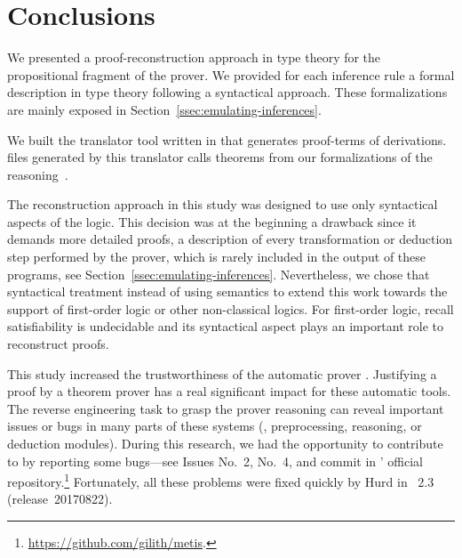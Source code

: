 \documentclass[../main.tex]{subfiles}
\begin{document}

\section{Conclusions}
\label{sec:conclusions}

We presented a proof-reconstruction approach in type theory for the
propositional fragment of the \Metis prover. We provided for each
\Metis inference rule a formal description in type theory following a
syntactical approach. These formalizations are mainly exposed in
Section~\ref{ssec:emulating-inferences}.

We built the \Athena translator tool written in \Haskell
that generates \Agda proof-terms of \Metis derivations.
\Agda files generated by this translator calls theorems from our
\Agda formalizations of the \Metis reasoning~\cite{AgdaProp,AgdaMetis}.


The reconstruction approach in this study was designed to use
only syntactical aspects of the logic.
This decision was at the beginning a drawback
since it demands more detailed proofs, a
description of every transformation or deduction step performed by
the prover, which is rarely included in the output of these programs,
see Section~\ref{ssec:emulating-inferences}.
Nevertheless, we chose that syntactical treatment instead of using
semantics to extend this work towards the support of first-order
logic or other non-classical logics.
For first-order logic, recall satisfiability is undecidable and
its syntactical aspect plays an important role to reconstruct proofs.

This study increased the
trustworthiness of the automatic prover \Metis. Justifying a proof by
a theorem prover has a real significant impact for these automatic
tools.  The reverse engineering task to grasp the prover
reasoning can reveal important issues or bugs in many parts of these
systems (\eg, preprocessing, reasoning, or deduction modules). During
this research, we had the opportunity to contribute to \Metis by
reporting some bugs---see Issues No.~2, No.~4, and commit
 in \Metis' official
repository.\footnote{\url{https://github.com/gilith/metis}.}
Fortunately, all these problems were fixed quickly by Hurd in
\Metis~2.3 (release~20170822).
\end{document}
